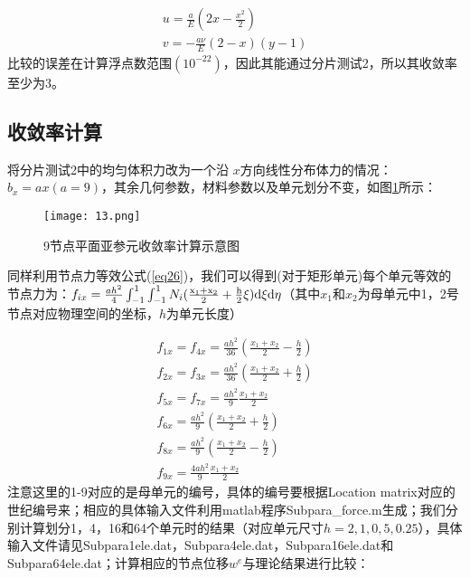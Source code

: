 \documentclass[forprint]{WHUBachelor}
\begin{document}
\begin{equation}
\begin{array}{c}
u=\frac{a}{E}(2x-\frac{x^{2}}{2})\\
v=-\frac{a\nu}{E}(2-x)(y-1)
\end{array}\label{eq30}
\end{equation}
比较的误差在计算浮点数范围$(10^{-22})$，因此其能通过分片测试2，所以其收敛率至少为3。

\subsection{收敛率计算}

将分片测试2中的均匀体积力改为一个沿 $x$方向线性分布体力的情况：$b_{x}=ax(a=9)$，其余几何参数，材料参数以及单元划分不变，如图\ref{f13}所示：

\begin{figure}[H]
\centering  
\texttt{[image: 13.png]} 
\caption{9节点平面亚参元收敛率计算示意图} 
\label{f13} 
\end{figure}

同样利用节点力等效公式(\ref{eq26})，我们可以得到(对于矩形单元)每个单元等效的节点力为：$f_{ix}=\frac{ah^{2}}{4}\int_{-1}^{1}\int_{-1}^{1}N_{i}{\rm (\frac{x_{1}+x_{2}}{2}+\frac{h}{2}\xi)d}\xi{\rm d\eta}$（其中$x_{1}$和$x_{2}$为母单元中1，2号节点对应物理空间的坐标，$h$为单元长度）

\begin{equation}
\begin{array}{c}
f_{1x}=f_{4x}=\frac{ah^{2}}{36}(\frac{x_{1}+x_{2}}{2}-\frac{h}{2})\\
f_{2x}=f_{3x}=\frac{ah^{2}}{36}(\frac{x_{1}+x_{2}}{2}+\frac{h}{2})\\
f_{5x}=f_{7x}=\frac{ah^{2}}{9}\frac{x_{1}+x_{2}}{2}\\
f_{6x}=\frac{ah^{2}}{9}(\frac{x_{1}+x_{2}}{2}+\frac{h}{2})\\
f_{8x}=\frac{ah^{2}}{9}(\frac{x_{1}+x_{2}}{2}-\frac{h}{2})\\
f_{9x}=\frac{4ah^{2}}{9}\frac{x_{1}+x_{2}}{2}
\end{array}\label{eq31}
\end{equation}
注意这里的1-9对应的是母单元的编号，具体的编号要根据Location matrix对应的世纪编号来；相应的具体输入文件利用matlab程序Subpara\_force.m生成；我们分别计算划分1，4，16和64个单元时的结果（对应单元尺寸$h=2,1,0,5,0.25$），具体输入文件请见Subpara1ele.dat，Subpara4ele.dat，Subpara16ele.dat和Subpara64ele.dat；计算相应的节点位移$w^{e}$与理论结果进行比较：
\end{document}
